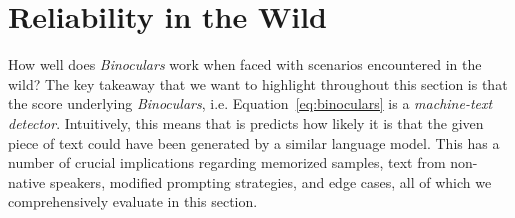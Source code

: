 \documentclass{article} %
\begin{document}
%     

%     



\section{Reliability in the Wild}
\label{sec:edge-cases}

How well does \textit{Binoculars} work when faced with scenarios encountered in the wild? 
The key takeaway that we want to highlight throughout this section is that the score underlying \textit{Binoculars}, i.e. Equation~\eqref{eq:binoculars} is a \emph{machine-text detector}. Intuitively, this means that is predicts how likely it is that the given piece of text could have been generated by a similar language model. %
This has a number of crucial implications regarding memorized samples, text from non-native speakers, modified prompting strategies, and edge cases, all of which we comprehensively evaluate in this section. 
\end{document}
